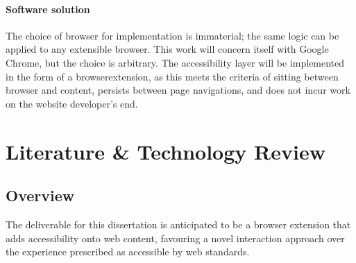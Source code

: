 \documentclass[11pt,openright,a4paper]{report}
\begin{document}
\subsubsection{Software solution}
\label{sec:softwaresolution}
The choice of browser for implementation is immaterial; the same logic can be applied to any extensible browser. This work will concern itself with Google Chrome, but the choice is arbitrary.
The accessibility layer will be implemented in the form of a \gls{browserextension}, as this meets the criteria of sitting between browser and content, persists between page navigations, and does not incur work on the website developer's end.

\chapter{Literature \& Technology Review}
\label{chap:litreview}
\section{Overview}
The deliverable for this dissertation is anticipated to be a browser extension that adds accessibility onto web content, favouring a novel interaction approach over the experience prescribed as accessible by web standards.
\end{document}
